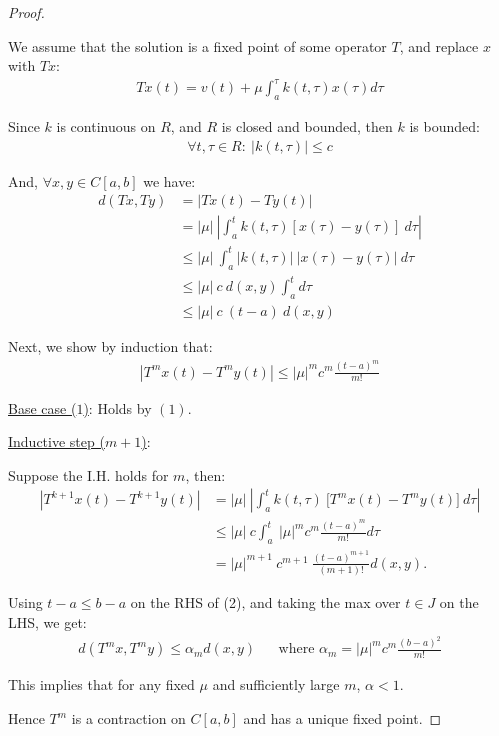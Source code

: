 \documentclass{article}
\theoremstyle{definition}
\begin{document}
\begin{proof}
  $ $
  
  We assume that the solution is a fixed point of some operator $T$, and replace $x$ with $Tx$:
  \begin{align*}
    Tx(t) = v(t) + \mu \int_{a}^{\tau} k(t, \tau) x(\tau) d\tau
  \end{align*}

  Since $k$ is continuous on $R$, and $R$ is closed and bounded, then $k$ is bounded:
  \begin{align*}
    \forall t, \tau \in R: \: |k(t, \tau)| \leq c
  \end{align*}

  And, $\forall x,y \in C[a,b]$ we have:
  \begin{align}
    d(Tx, Ty)
    &= |T x(t) - T y(t)| \nonumber \\
    &= |\mu| \: |\int_{a}^{t} k(t, \tau) [x(\tau) - y(\tau)]\: d\tau| \nonumber \\
    &\leq |\mu| \: \int_{a}^{t} |k(t, \tau)| \:  |x(\tau) - y(\tau)|\: d\tau \nonumber \\
    &\leq |\mu| \: c \: d(x,y) \int_{a}^{t} d\tau \nonumber \\
    &\leq |\mu| \: c \: (t-a) \: d(x,y)
  \end{align}

  Next, we show by induction that:
  \begin{align}
    |T^m x(t) - T^m y(t)| \leq |\mu|^m c^m \frac{(t-a)^m}{m!}
  \end{align}

  \underline{Base case ($1$)}: Holds by $(1)$.
  \newline

  \underline{Inductive step ($m+1$)}:
  \newline

  Suppose the I.H. holds for $m$, then:
  \begin{align*}
    |T^{k+1} x(t) - T^{k+1} y(t)|
    &= |\mu| \: | \int_{a}^{t} k(t, \tau) \: \lbrack T^m x(t) - T^m y(t) \rbrack \: d\tau | \\
    &\leq |\mu| \: c \int_{a}^{t} \: |\mu|^m c^m \frac{(t-a)^m}{m!} d\tau \\
    &= |\mu|^{m+1} \: c^{m+1} \: \frac{(t-a)^{m+1}}{(m+1)!} d(x,y).
  \end{align*}

  Using $t-a \leq b-a$ on the RHS of (2), and taking the max over $t \in J$ on the LHS, we get:
  \begin{align*}
    d(T^mx, T^my) \leq \alpha_m d(x,y) && \text{where } \alpha_m = |\mu|^m c^m \frac{(b-a)^2}{m!}
  \end{align*}

  This implies that for any fixed $\mu$ and sufficiently large $m$, $\alpha < 1$.
  
  Hence $T^m$ is a contraction on $C[a,b]$ and has a unique fixed point.

\end{proof}
\end{document}
